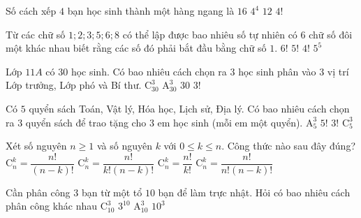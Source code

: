 \begin{ex}%
	Số cách xếp $4$ bạn học sinh thành một hàng ngang là
	\choice
	{ $16$}
	{ $4^4$}
	{ $12$}
	{\True $4!$}
\end{ex}
\begin{ex}%
	Từ các chữ số $1;2;3;5;6;8$ có thể lập được bao nhiêu số tự nhiên có $6$ chữ số đôi một khác nhau biết rằng các số đó phải bắt đầu bằng chữ số $1$.
	\choice
	{ $6!$}
	{\True $5!$}
	{ $4!$}
	{ $5^5$}
\end{ex}
\begin{ex}%
	Lớp $11A$ có $30$ học sinh. Có bao nhiêu cách chọn ra $3$ học sinh phân vào $3$ vị trí Lớp trưởng, Lớp phó và Bí thư.
	\choice
	{ $\mathrm{C}_{30}^3$}
	{\True $\mathrm{A}_{30}^3$}
	{ $30$}
	{ $3!$}
\end{ex}
\begin{ex}%
	Có $5$ quyển sách Toán, Vật lý, Hóa học, Lịch sử, Địa lý. Có bao nhiêu cách chọn ra $3$ quyển sách để trao tặng cho $3$ em học sinh (mỗi em một quyển).
	\choice
	{\True $\mathrm{A}_5^3$}
	{ $5!$}
	{ $3!$}
	{ $\mathrm{C}_5^3$}
\end{ex}
\begin{ex}%
	Xét số nguyên $n\ge 1$ và số nguyên $k$ với $0\le k\le n$. Công thức nào sau đây đúng?
	\choice
	{ $\mathrm{C}_n^k=\dfrac{n!}{\left( n-k \right)!}$}
	{\True $\mathrm{C}_n^k=\dfrac{n!}{k!\left( n-k \right)!}$}
	{ $\mathrm{C}_n^k=\dfrac{n!}{k!}$}
	{ $\mathrm{C}_n^k=\dfrac{n!}{n!\left( n-k \right)!}$}
\end{ex}
\begin{ex}%
	Cần phân công $3$ bạn từ một tổ $10$ bạn để làm trực nhật. Hỏi có bao nhiêu cách phân công khác nhau
	\choice
	{\True $\mathrm{C}_{10}^3$}
	{ ${3^{10}}$}
	{ $\mathrm{A}_{10}^3$}
	{ ${{10}^3}$}
\end{ex}
